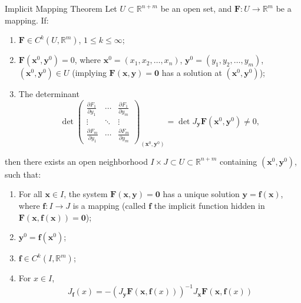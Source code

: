 \documentclass[11pt]{../../TexTemplate/elegantbook}
\begin{document}
\begin{theorem}{Implicit Mapping Theorem}
    Let \( U \subset \mathbb{R}^{n+m} \) be an open set, and \( \mathbf{F}: U \to \mathbb{R}^m \) be a mapping. If:
    \begin{enumerate}
        \item \( \mathbf{F} \in C^k(U, \mathbb{R}^m) \), \( 1 \leqslant k \leqslant \infty \);
        \item \( \mathbf{F}(\mathbf{x}^0, \mathbf{y}^0) = 0 \), 
            where \( \mathbf{x}^0 = (x_1, x_2, \dots, x_n) \), \( \mathbf{y}^0 = (y_1, y_2, \dots, y_m) \), 
            \( (\mathbf{x}^0, \mathbf{y}^0) \in U \) 
            (implying \( \mathbf{F}(\mathbf{x}, \mathbf{y}) = \mathbf{0} \) 
            has a solution at \( (\mathbf{x}^0, \mathbf{y}^0) \));
        \item The determinant
        \[
        \det
        \begin{pmatrix}
            \frac{\partial F_1}{\partial y_1} & \cdots & \frac{\partial F_1}{\partial y_m} \\
            \vdots & \ddots & \vdots \\
            \frac{\partial F_m}{\partial y_1} & \cdots & \frac{\partial F_m}{\partial y_m}
        \end{pmatrix}_{(\mathbf{x}^0, \mathbf{y}^0)}
        = \det J_{\mathbf{y}} \mathbf{F}(\mathbf{x}^0, \mathbf{y}^0) \neq 0,
        \]
    \end{enumerate}
    then there exists an open neighborhood \( I \times J \subset U \subset \mathbb{R}^{n+m} \) 
    containing \( (\mathbf{x}^0, \mathbf{y}^0) \), such that:
    \begin{enumerate}
        \item For all \( \mathbf{x} \in I \), the system \( \mathbf{F}(\mathbf{x}, \mathbf{y}) = \mathbf{0} \) 
            has a unique solution \( \mathbf{y} = \mathbf{f}(\mathbf{x}) \), 
            where \( \mathbf{f}: I \to J \) is a mapping 
            (called \( \mathbf{f} \) the implicit function hidden in 
            \( \mathbf{F}(\mathbf{x}, \mathbf{f}(\mathbf{x})) = \mathbf{0} \));
        \item \( \mathbf{y}^0 = \mathbf{f}(\mathbf{x}^0) \);
        \item \( \mathbf{f} \in C^k(I, \mathbb{R}^m) \);
        \item For \( x \in I \),
        \[
        J_{\mathbf{f}}(x) = 
            - (J_{\mathbf{y}} \mathbf{F}(\mathbf{x}, \mathbf{f}(x)))^{-1} J_{\mathbf{x}} \mathbf{F}(\mathbf{x}, \mathbf{f}(x))
\]
\end{enumerate}
\end{theorem}
\end{document}
